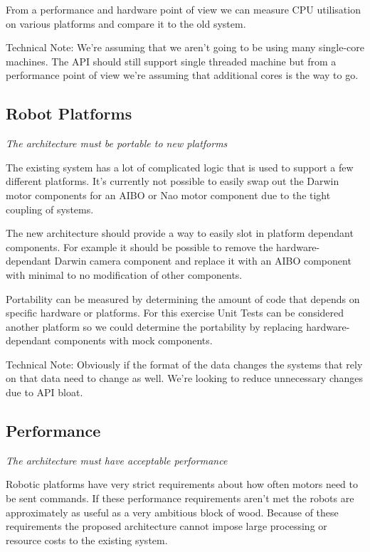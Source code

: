\documentclass[english,12pt]{scrartcl}
\newcommand{\requirement}[1]{\textit{#1}}
\begin{document}
            From a performance and hardware point of view we can measure CPU utilisation on various
            platforms and compare it to the old system.
            
            Technical Note: We're assuming that we aren't going to be using many single-core
            machines. The API should still support single threaded machine but from a performance
            point of view we're assuming that additional cores is the way to go.

        \subsection{Robot Platforms}
            \requirement{The architecture must be portable to new platforms}
            
            The existing system has a lot of complicated logic that is used to support a few
            different platforms. It's currently not possible to easily swap out the Darwin motor
            components for an AIBO or Nao motor component due to the tight coupling of systems.
            
            The new architecture should provide a way to easily slot in platform dependant
            components. For example it should be possible to remove the hardware-dependant Darwin
            camera component and replace it with an AIBO component with minimal to no modification
            of other components.
            
            Portability can be measured by determining the amount of code that depends on specific
            hardware or platforms. For this exercise Unit Tests can be considered another platform
            so we could determine the portability by replacing hardware-dependant components with
            mock components. 
            
            Technical Note: Obviously if the format of the data changes the systems that rely on
            that data need to change as well. We're looking to reduce unnecessary changes due to API
            bloat.
        
        \subsection{Performance}
            \requirement{The architecture must have acceptable performance}
            
            Robotic platforms have very strict requirements about how often motors need to be sent
            commands. If these performance requirements aren't met the robots are approximately as
            useful as a very ambitious block of wood. Because of these requirements the proposed
            architecture cannot impose large processing or resource costs to the existing system.
            
\end{document}
